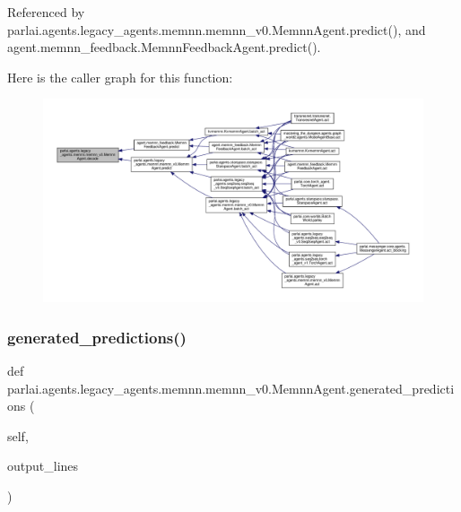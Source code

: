 Referenced by parlai.\+agents.\+legacy\+\_\+agents.\+memnn.\+memnn\+\_\+v0.\+Memnn\+Agent.\+predict(), and agent.\+memnn\+\_\+feedback.\+Memnn\+Feedback\+Agent.\+predict().

Here is the caller graph for this function\+:
\nopagebreak
\begin{figure}[H]
\begin{center}
\leavevmode
\includegraphics[width=350pt]{classparlai_1_1agents_1_1legacy__agents_1_1memnn_1_1memnn__v0_1_1MemnnAgent_ae18c65a307c2a3c164beb6cf0bb5b62b_icgraph}
\end{center}
\end{figure}
\mbox{\label{classparlai_1_1agents_1_1legacy__agents_1_1memnn_1_1memnn__v0_1_1MemnnAgent_a15b8b76a2d2ae5e0a4de2978e5ac0ac5}} 
\subsubsection{\texorpdfstring{generated\+\_\+predictions()}{generated\_predictions()}}
{\footnotesize\ttfamily def parlai.\+agents.\+legacy\+\_\+agents.\+memnn.\+memnn\+\_\+v0.\+Memnn\+Agent.\+generated\+\_\+predictions (\begin{DoxyParamCaption}\item[{}]{self,  }\item[{}]{output\+\_\+lines }\end{DoxyParamCaption})}



